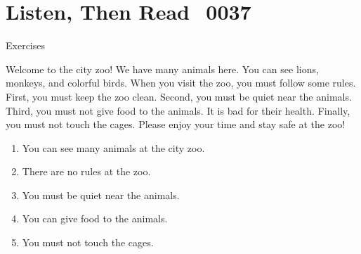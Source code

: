 \documentclass[aspectratio=169,xcolor={dvipsnames,table}]{beamer}
\newcommand{\myaudio}[1]{\href{#1}{\faVolumeUp}}
\begin{document}
\section{Listen, Then Read\,\,\,\,\,{\tiny 0037}\,{\scriptsize \myaudio{./audio/013_must_reading.mp3}}}
\begin{frame}[plain,t]{Exercises}
\begin{tcolorbox}[colframe=ForestGreen,
  colback=NavyBlue!10!white,
  colbacktitle=NavyBlue!40!white,
  coltitle=black, %
before upper={\setlength{\parindent}{1.25em}},
 title={{Rules at the Zoo}\hfill{\tiny 0047}\quad{\scriptsize \myaudio{./audio/013_must_reading.mp3}}}
]
Welcome to the city zoo! We have many animals here. You can see lions, monkeys, and colorful birds.
When you visit the zoo, you must follow some rules. First, you must keep the zoo clean. Second, you must be quiet near the animals.
Third, you must not give food to the animals. It is bad for their health. Finally, you must not touch the cages. Please enjoy your time and stay safe at the zoo!
\end{tcolorbox}
\vspace{-4pt}
\vspace{-11pt}
\begin{enumerate}\setlength{\itemsep}{-3.2pt}
\item<2-> You can see many animals at the city zoo.\hfill{}
\item<2-> There are no rules at the zoo.\hfill{}
\item<2-> You must be quiet near the animals.\hfill{}
\item<2-> You can give food to the animals.\hfill{}
\item<2-> You must not touch the cages.\hfill{}
\end{enumerate}
\end{frame}
\end{document}
